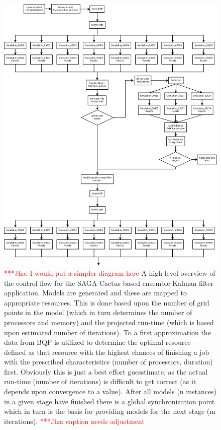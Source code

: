 \documentclass[conference,final]{IEEEtran}
\newcommand{\jhanote}[1]{ {\textcolor{red} { ***Jha: #1 }}}
\begin{document}
\begin{figure}
\begin{center}
\includegraphics[scale=0.16]{./yaakoubs_inspiring_art.jpeg}
\end{center}
\caption{\jhanote{I would put a simpler diagram here} A high-level
  overview of the control flow for the SAGA-Cactus based ensemble
  Kalman filter application. Models are generated and these are mapped
  to appropriate resources. This is done based upon the number of grid
  points in the model (which in turn determines the number of
  processors and memory) and the projected run-time (which is based
  upon estimated number of iterations). To a first approximation the
  data from BQP is utilized to determine the optimal resource --
  defined as that resource with the highest chances of finishing a job
  with the prescribed characteristics (number of processors, duration)
  first. Obviously this is just a best effort guesstimate, as the
  actual run-time (number of iterations) is difficult to get correct
  (as it depends upon convergence to a value). After all models (n
  instances) in a given stage have finished there is a global
  synchronization point which in turn is the basis for providing
  models for the next stage (m iterations). \jhanote{caption needs
    adjustment}}
\label{fig:controlflow}
\end{figure}
\end{document}
